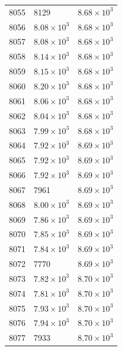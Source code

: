 \begin{table}[H]
\begin{tabular}{lll}
8055 & 8129 & $\displaystyle 8.68 \times 10^{3}$ \\
8056 & $\displaystyle 8.08 \times 10^{3}$ & $\displaystyle 8.68 \times 10^{3}$ \\
8057 & $\displaystyle 8.08 \times 10^{3}$ & $\displaystyle 8.68 \times 10^{3}$ \\
8058 & $\displaystyle 8.14 \times 10^{3}$ & $\displaystyle 8.68 \times 10^{3}$ \\
8059 & $\displaystyle 8.15 \times 10^{3}$ & $\displaystyle 8.68 \times 10^{3}$ \\
8060 & $\displaystyle 8.20 \times 10^{3}$ & $\displaystyle 8.68 \times 10^{3}$ \\
8061 & $\displaystyle 8.06 \times 10^{3}$ & $\displaystyle 8.68 \times 10^{3}$ \\
8062 & $\displaystyle 8.04 \times 10^{3}$ & $\displaystyle 8.68 \times 10^{3}$ \\
8063 & $\displaystyle 7.99 \times 10^{3}$ & $\displaystyle 8.68 \times 10^{3}$ \\
8064 & $\displaystyle 7.92 \times 10^{3}$ & $\displaystyle 8.69 \times 10^{3}$ \\
8065 & $\displaystyle 7.92 \times 10^{3}$ & $\displaystyle 8.69 \times 10^{3}$ \\
8066 & $\displaystyle 7.92 \times 10^{3}$ & $\displaystyle 8.69 \times 10^{3}$ \\
8067 & 7961 & $\displaystyle 8.69 \times 10^{3}$ \\
8068 & $\displaystyle 8.00 \times 10^{3}$ & $\displaystyle 8.69 \times 10^{3}$ \\
8069 & $\displaystyle 7.86 \times 10^{3}$ & $\displaystyle 8.69 \times 10^{3}$ \\
8070 & $\displaystyle 7.85 \times 10^{3}$ & $\displaystyle 8.69 \times 10^{3}$ \\
8071 & $\displaystyle 7.84 \times 10^{3}$ & $\displaystyle 8.69 \times 10^{3}$ \\
8072 & 7770 & $\displaystyle 8.69 \times 10^{3}$ \\
8073 & $\displaystyle 7.82 \times 10^{3}$ & $\displaystyle 8.70 \times 10^{3}$ \\
8074 & $\displaystyle 7.81 \times 10^{3}$ & $\displaystyle 8.70 \times 10^{3}$ \\
8075 & $\displaystyle 7.93 \times 10^{3}$ & $\displaystyle 8.70 \times 10^{3}$ \\
8076 & $\displaystyle 7.94 \times 10^{3}$ & $\displaystyle 8.70 \times 10^{3}$ \\
8077 & 7933 & $\displaystyle 8.70 \times 10^{3}$ \\

\end{tabular}
\end{table}
